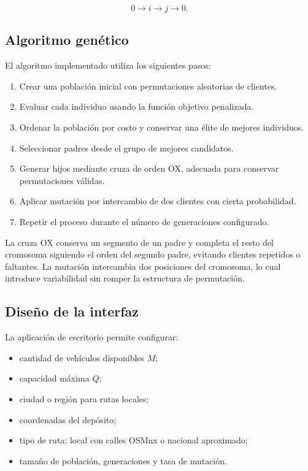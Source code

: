\documentclass[runningheads]{llncs}
\begin{document}
\begin{equation}
0 \rightarrow i \rightarrow j \rightarrow 0.
\end{equation}

\subsection{Algoritmo genético}

El algoritmo implementado utiliza los siguientes pasos:

\begin{enumerate}
    \item Crear una población inicial con permutaciones aleatorias de clientes.
    \item Evaluar cada individuo usando la función objetivo penalizada.
    \item Ordenar la población por costo y conservar una élite de mejores individuos.
    \item Seleccionar padres desde el grupo de mejores candidatos.
    \item Generar hijos mediante cruza de orden OX, adecuada para conservar permutaciones válidas.
    \item Aplicar mutación por intercambio de dos clientes con cierta probabilidad.
    \item Repetir el proceso durante el número de generaciones configurado.
\end{enumerate}

La cruza OX conserva un segmento de un padre y completa el resto del cromosoma siguiendo el orden del segundo padre, evitando clientes repetidos o faltantes. La mutación intercambia dos posiciones del cromosoma, lo cual introduce variabilidad sin romper la estructura de permutación.

\subsection{Diseño de la interfaz}

La aplicación de escritorio permite configurar:

\begin{itemize}
    \item cantidad de vehículos disponibles $M$;
    \item capacidad máxima $Q$;
    \item ciudad o región para rutas locales;
    \item coordenadas del depósito;
    \item tipo de ruta: local con calles OSMnx o nacional aproximado;
    \item tamaño de población, generaciones y tasa de mutación.
\end{itemize}
\end{document}
